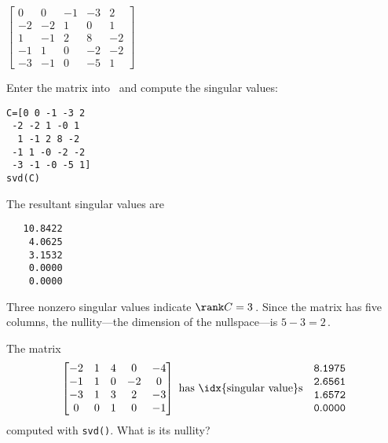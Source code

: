 \begin{example}
\begin{Parts}
\item \(\begin{bmatrix} 0&0&-1&-3&2
\\-2&-2&1&0&1
\\1&-1&2&8&-2
\\-1&1&0&-2&-2
\\-3&-1&0&-5&1 \end{bmatrix}\)
\begin{solution} 
Enter the matrix into \script\ and compute the singular values:
\begin{verbatim}
C=[0 0 -1 -3 2
 -2 -2 1 -0 1
  1 -1 2 8 -2
 -1 1 -0 -2 -2
 -3 -1 -0 -5 1]
svd(C)
\end{verbatim}
\setbox\ajrqrbox\hbox{}%
\marginajrbox%
The resultant singular values are
\begin{verbatim}
   10.8422
    4.0625
    3.1532
    0.0000
    0.0000
\end{verbatim}
Three nonzero singular values indicate \(\rank C=3\)\,.
Since the matrix has five columns, the nullity---the dimension of the nullspace---is \(5-3=2\)\,. 
\end{solution}


\end{Parts}
\end{example}



\begin{activity}
The matrix
\begin{equation*}
\begin{bmatrix} -2&1&4&0&-4
\\-1&1&0&-2&0
\\-3&1&3&2&-3
\\0&0&1&0&-1 \end{bmatrix}
\text{ has \idx{singular value}s}\quad
\begin{matrix}\tt 8.1975
\\\tt 2.6561
\\\tt 1.6572
\\\tt 0.0000 \end{matrix}
\end{equation*}
computed with \verb|svd()|.
What is its nullity?
\end{activity}





